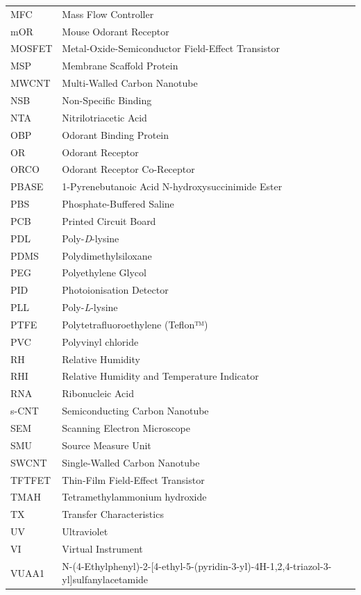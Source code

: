 \documentclass[
  a4paper,
]{scrbook}
\begin{document}
\newpage
\pagestyle{plain} %
\begin{table}[h]
  \begin{tabular}{@{}p{} p{}@{}}  %
    MFC  & Mass Flow Controller   \\
    mOR  & Mouse Odorant Receptor  \\
    MOSFET  & Metal-Oxide-Semiconductor Field-Effect Transistor  \\
    MSP  & Membrane Scaffold Protein  \\
    MWCNT  & Multi-Walled Carbon Nanotube   \\
    NSB  & Non-Specific Binding   \\
    NTA  & Nitrilotriacetic Acid   \\
    OBP  & Odorant Binding Protein  \\
    OR  & Odorant Receptor  \\
    ORCO  & Odorant Receptor Co-Receptor  \\
    PBASE  & 1-Pyrenebutanoic Acid N-hydroxysuccinimide Ester  \\ 
    PBS  & Phosphate-Buffered Saline  \\
    PCB  & Printed Circuit Board   \\
    PDL & Poly-\textit{D}-lysine  \\
    PDMS  & Polydimethylsiloxane   \\  
    PEG  & Polyethylene Glycol  \\ 
    PID  & Photoionisation Detector  \\ 
    PLL  & Poly-\textit{L}-lysine  \\
    PTFE  & Polytetrafluoroethylene (Teflon™)  \\
    PVC  & Polyvinyl chloride  \\
    RH  & Relative Humidity  \\
    RHI  & Relative Humidity and Temperature Indicator  \\
    RNA  & Ribonucleic Acid   \\ 
    s-CNT  & Semiconducting Carbon Nanotube   \\
    SEM  & Scanning Electron Microscope   \\
    SMU  & Source Measure Unit   \\
    SWCNT  & Single-Walled Carbon Nanotube   \\
    TFTFET  & Thin-Film Field-Effect Transistor  \\
    TMAH  & Tetramethylammonium hydroxide  \\
    TX  & Transfer Characteristics  \\
    UV  & Ultraviolet  \\
    VI  & Virtual Instrument  \\
    VUAA1  & N-(4-Ethylphenyl)-2-{[4-ethyl-5-(pyridin-3-yl)-4H-1,2,4-triazol-3-yl]sulfanyl}acetamide  \\ 
  \end{tabular}
\end{table}
\end{document}
